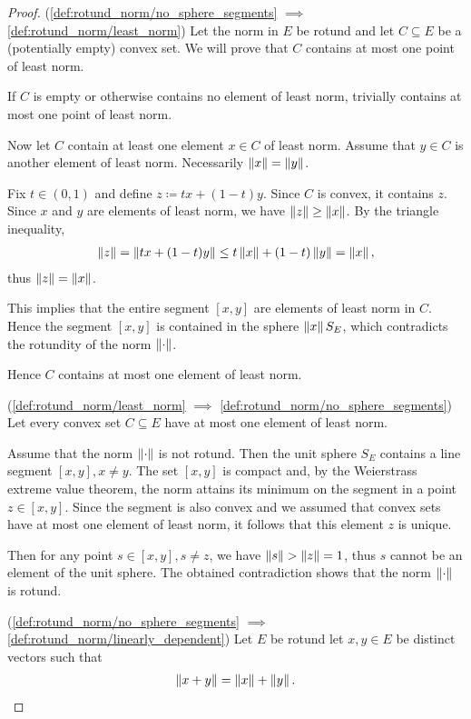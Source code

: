 \begin{proof}
  (\ref{def:rotund_norm/no_sphere_segments} $\implies$ \ref{def:rotund_norm/least_norm}) Let the norm in $E$ be rotund and let $C \subseteq E$ be a (potentially empty) convex set. We will prove that $C$ contains at most one point of least norm.

  If $C$ is empty or otherwise contains no element of least norm, trivially contains at most one point of least norm.

  Now let $C$ contain at least one element $x \in C$ of least norm. Assume that $y \in C$ is another element of least norm. Necessarily $\left\Vert x \right\Vert = \left\Vert y \right\Vert$.

  Fix $t \in (0, 1)$ and define $z \coloneqq tx + (1-t)y$. Since $C$ is convex, it contains $z$. Since $x$ and $y$ are elements of least norm, we have $\left\Vert z \right\Vert \geq \left\Vert x \right\Vert$. By the triangle inequality,
  \begin{align*}
    \left\Vert z \right\Vert
    =
    \left\Vert tx + (1-t)y \right\Vert
    \leq
    t \left\Vert x \right\Vert + (1-t) \left\Vert y \right\Vert
    =
    \left\Vert x \right\Vert,
  \end{align*}
  thus $\left\Vert z \right\Vert = \left\Vert x \right\Vert$.

  This implies that the entire segment $[x, y]$ are elements of least norm in $C$. Hence the segment $[x, y]$ is contained in the sphere $\left\Vert x \right\Vert S_E$, which contradicts the rotundity of the norm $\left\Vert \cdot \right\Vert$.

  Hence $C$ contains at most one element of least norm.

  (\ref{def:rotund_norm/least_norm} $\implies$ \ref{def:rotund_norm/no_sphere_segments}) Let every convex set $C \subseteq E$ have at most one element of least norm.

  Assume that the norm $\left\Vert \cdot \right\Vert$ is not rotund. Then the unit sphere $S_E$ contains a line segment $[x, y], x \neq y$. The set $[x, y]$ is compact and, by the Weierstrass extreme value theorem, the norm attains its minimum on the segment in a point $z \in [x, y]$. Since the segment is also convex and we assumed that convex sets have at most one element of least norm, it follows that this element $z$ is unique.

  Then for any point $s \in [x, y], s \neq z$, we have $\left\Vert s \right\Vert > \left\Vert z \right\Vert = 1$, thus $s$ cannot be an element of the unit sphere. The obtained contradiction shows that the norm $\left\Vert \cdot \right\Vert$ is rotund.

  (\ref{def:rotund_norm/no_sphere_segments} $\implies$ \ref{def:rotund_norm/linearly_dependent}) Let $E$ be rotund let $x, y \in E$ be distinct vectors such that
  \begin{align}\label{def:rotund_norm/linearly_dependent/assumption}
    \left\Vert x + y \right\Vert = \left\Vert x \right\Vert + \left\Vert y \right\Vert.
  \end{align}


\end{proof}
